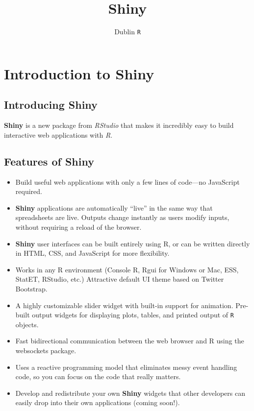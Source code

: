 \documentclass[]{article}
\title{Shiny}
\author{Dublin \texttt{R}}
\begin{document}
\maketitle

\section{Introduction to Shiny}

\subsection{Introducing Shiny}
\textbf{Shiny} is a new package from \textit{RStudio} that makes it incredibly easy to build interactive web applications with \textit{R}.


\subsection{Features of Shiny}
\begin{itemize}
\item Build useful web applications with only a few lines of code—no JavaScript required.
\item \textbf{Shiny} applications are automatically “live” in the same way that spreadsheets are live. Outputs change instantly as users modify inputs, without requiring a reload of the browser.
\item \textbf{Shiny} user interfaces can be built entirely using R, or can be written directly in HTML, CSS, and JavaScript for more flexibility.
\item Works in any R environment (Console R, Rgui for Windows or Mac, ESS, StatET, RStudio, etc.)
Attractive default UI theme based on Twitter Bootstrap.
\item A highly customizable slider widget with built-in support for animation.
Pre-built output widgets for displaying plots, tables, and printed output of \texttt{R} objects.
\item Fast bidirectional communication between the web browser and R using the websockets package.
\item Uses a reactive programming model that eliminates messy event handling code, so you can focus on the code that really matters.
\item Develop and redistribute your own \textbf{Shiny} widgets that other developers can easily drop into their own applications (coming soon!).
\end{itemize}
\end{document}
